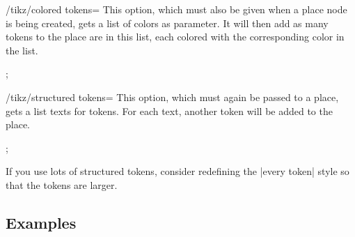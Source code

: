 \begin{key}{/tikz/colored tokens=}
  This option, which must also be given when a place node is being
  created, gets a list of colors as parameter. It will then add as
  many tokens to the place are in this list, each colored with the
  corresponding color in the list.
\begin{codeexample}[]
\tikz  \node[place,colored tokens={black,black,red,blue}] {};
\end{codeexample}
\end{key}
\begin{key}{/tikz/structured tokens=}
  This option, which must again be passed to a place, gets a list
  texts for tokens. For each text, another token will be added to the place.
\begin{codeexample}[]
\tikz  \node[place,structured tokens={$x$,$y$,$z$}] {};
\end{codeexample}
\begin{codeexample}[]
\end{codeexample}
  If you use lots of structured tokens, consider redefining the
  |every token| style so that the tokens are larger.
\end{key}


\subsection{Examples}


